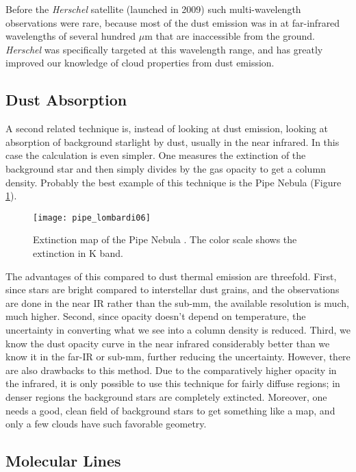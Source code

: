 Before the \textit{Herschel} satellite (launched in 2009) such multi-wavelength observations were rare, because most of the dust emission was in at far-infrared wavelengths of several hundred $\mu$m that are inaccessible from the ground. \textit{Herschel} was specifically targeted at this wavelength range, and has greatly improved our knowledge of cloud properties from dust emission.

\subsection{Dust Absorption}

A second related technique is, instead of looking at dust emission, looking at absorption of background starlight by dust, usually in the near infrared. In this case the calculation is even simpler. One measures the extinction of the background star and then simply divides by the gas opacity to get a column density. Probably the best example of this technique is the Pipe Nebula (Figure \ref{fig:pipe_lombardi06}).  

\begin{figure}
\texttt{[image: pipe\_lombardi06]}
\caption[Dust extinction map of the Pipe Nebula]{
\label{fig:pipe_lombardi06}
Extinction map of the Pipe Nebula \citep{lombardi06a}. The color scale shows the extinction in K band.
}
\end{figure}

The advantages of this compared to dust thermal emission are threefold. First, since stars are bright compared to interstellar dust grains, and the observations are done in the near IR rather than the sub-mm, the available resolution is much, much higher. Second, since opacity doesn't depend on temperature, the uncertainty in converting what we see into a column density is reduced. Third, we know the dust opacity curve in the near infrared considerably better than we know it in the far-IR or sub-mm, further reducing the uncertainty. However, there are also drawbacks to this method. Due to the comparatively higher opacity in the infrared, it is only possible to use this technique for fairly diffuse regions; in denser regions the background stars are completely extincted. Moreover, one needs a good, clean field of background stars to get something like a map, and only a few clouds have such favorable geometry.


\subsection{Molecular Lines}
\label{ssec:molecular_lines}

